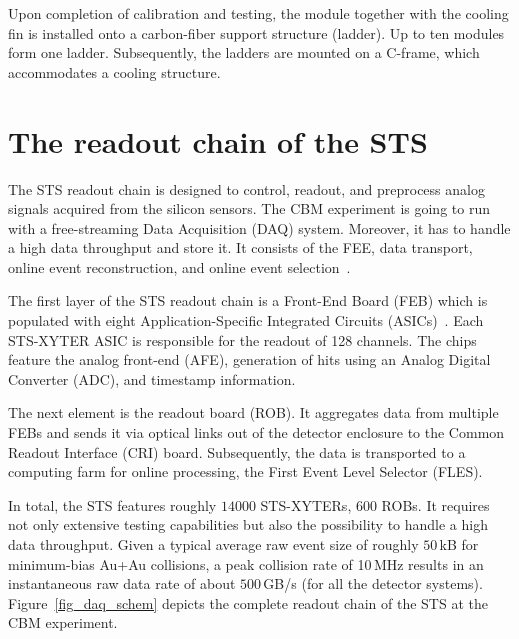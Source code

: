 Upon completion of calibration and testing, the module together with the cooling fin is installed onto a carbon-fiber support structure (ladder). Up to ten modules form one ladder. Subsequently, the ladders are mounted on a C-frame, which accommodates a cooling structure. 
\section{The readout chain of the STS}
\label{readout}
\label{DAQ}
The \gls{STS} readout chain is designed to control, readout, and preprocess analog signals acquired from the silicon sensors. The \gls{CBM} experiment is going to run with a free-streaming Data Acquisition (\gls{DAQ}) system. Moreover, it has to handle a high data throughput and store it. It consists of the \gls{FEE}, data transport, online event reconstruction, and online event selection~\cite{Kasinski1}.

The first layer of the \gls{STS} readout chain is a Front-End Board (\gls{FEB}) which is populated with eight Application-Specific Integrated Circuits (ASICs)~\cite{Kasinski2}. Each STS-XYTER \gls{ASIC} is responsible for the readout of 128 channels. The chips feature the analog front-end (\gls{AFE}), generation of hits using an Analog Digital Converter (\gls{ADC}), and timestamp information. 

The next element is the readout board (\gls{ROB}). It aggregates data from multiple \glspl{FEB} and sends it via optical links out of the detector enclosure to the Common Readout Interface (\gls{CRI}) board. Subsequently, the data is transported to a computing farm for online processing, the First Event Level Selector (\gls{FLES}). 

In total, the \gls{STS} features roughly $14000$ STS-XYTERs, $600$ \glspl{ROB}. It requires not only extensive testing capabilities but also the possibility to handle a high data throughput. Given a typical average raw event size of roughly $50$\,kB for minimum-bias Au+Au collisions, a peak collision rate of 10\,MHz results in an instantaneous raw data rate of about $500$\,GB/s (for all the detector systems). Figure~\ref{fig_daq_schem} depicts the complete readout chain of the \gls{STS} at the \gls{CBM} experiment. 

